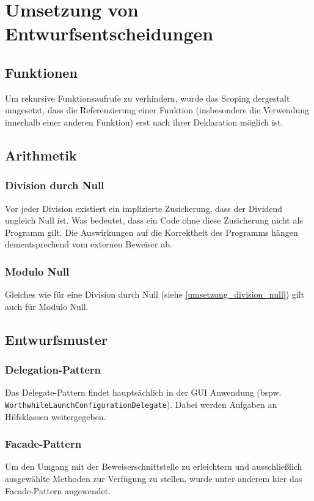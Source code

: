 \section{Umsetzung von Entwurfsentscheidungen}
\subsection{Funktionen}
Um rekursive Funktionsaufrufe zu verhindern, wurde das Scoping dergestalt umgesetzt, dass die Referenzierung einer Funktion (insbesondere die Verwendung innerhalb einer anderen Funktion) erst nach ihrer Deklaration möglich ist.

\subsection{Arithmetik}
\subsubsection{Division durch Null \label{umsetzung_division_null}}
Vor jeder Division existiert ein implizierte Zusicherung, dass der Dividend ungleich Null ist. Was bedeutet, dass ein Code ohne diese Zusicherung nicht als Programm gilt. Die Auswirkungen auf die Korrektheit des Programms hängen dementsprechend vom externen Beweiser ab.

\subsubsection{Modulo Null}
Gleiches wie für eine Division durch Null (siehe \ref{umsetzung_division_null}) gilt auch für Modulo Null.

\subsection{Entwurfsmuster}
\subsubsection{Delegation-Pattern}
Das Delegate-Pattern findet hauptsächlich in der GUI Anwendung (bspw. \\ \texttt{WorthwhileLaunchConfigurationDelegate}). Dabei werden Aufgaben an Hilfsklassen weitergegeben.

\subsubsection{Facade-Pattern}
Um den Umgang mit der Beweiserschnittstelle zu erleichtern und ausschließlich ausgewählte Methoden zur Verfügung zu stellen, wurde unter anderem hier das Facade-Pattern angewendet. 

